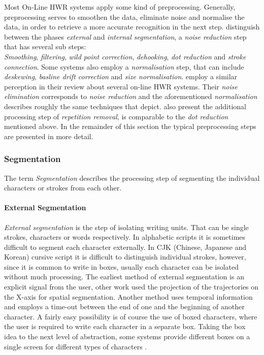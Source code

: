 
Most On-Line HWR systems apply some kind of preprocessing. Generally, 
preprocessing serves to smoothen the data, eliminate noise and normalise the
data, in order to retrieve a more accurate recognition in the next step.
 distinguish between the phases \emph{external} and 
\emph{internal segmentation}, a \emph{noise reduction} step that has several 
sub steps:\\
\emph{Smoothing}, \emph{filtering}, \emph{wild point correction}, 
\emph{dehooking}, \emph{dot reduction} and \emph{stroke connection}.
Some systems also employ a \emph{normalisation} step, that can include
\emph{deskewing}, \emph{basline drift correction} and \emph{size normalisation}.
 employ a similar perception in their review about several
on-line HWR systems. Their \emph{noise elimination} corresponds to 
\emph{noise reduction} and the aforementioned \emph{normalisation} describes 
roughly the same techniques that  depict.
 also present the additional processing step of 
\emph{repetition removal}, is comparable to the \emph{dot reduction} mentioned 
above. In the remainder of this section the typical preprocessing steps are 
presented in more detail.

\subsubsection{Segmentation}
\label{sec:segmentation}

The term \emph{Segmentation} describes the processing step of segmenting the 
individual characters or strokes from each other.

\paragraph{External Segmentation}
\label{sec:externasegmentation}
\emph{External segmentation} is the step of isolating writing units. That can be
single strokes, characters or words respectively. In alphabetic scripts it is 
sometimes difficult to segment each character externally. In CJK (Chinese, 
Japanese and Korean) cursive script it is difficult to distinguish individual 
strokes, however, since it is common to write in boxes, usually each character 
can be isolated without much processing.
The earliest method of external segmentation is an explicit signal from the user,
other work used the projection of the trajectories on the X-axis for spatial
segmentation. Another method uses temporal information and employs a time-out
between the end of one and the beginning of another character.
A fairly easy possibility is of course the use of boxed characters, where the 
user is required to write each character in a separate box.
Taking the box idea to the next level of abstraction, some systems provide 
different boxes on a single screen for different types of characters 
.

